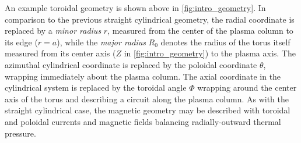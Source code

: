 \begin{figure}[h]
 \pushtooutside
\end{figure}

An example toroidal geometry is shown above in \cref{fig:intro_geometry}.  In comparison to the previous straight cylindrical geometry, the radial coordinate is replaced by a \emph{minor radius} $r$, measured from the center of the plasma column to its edge ($r=a$), while the \emph{major radius} $R_0$ denotes the radius of the torus itself measured from its center axis ($Z$ in \cref{fig:intro_geometry}) to the plasma axis.  The azimuthal cylindrical coordinate is replaced by the poloidal coordinate $\theta$, wrapping immediately about the plasma column.  The axial coordinate in the cylindrical system is replaced by the toroidal angle $\Phi$ wrapping around the center axis of the torus and describing a circuit along the plasma column.  As with the straight cylindrical case, the magnetic geometry may be described with toroidal and poloidal currents and magnetic fields balancing radially-outward thermal pressure.

